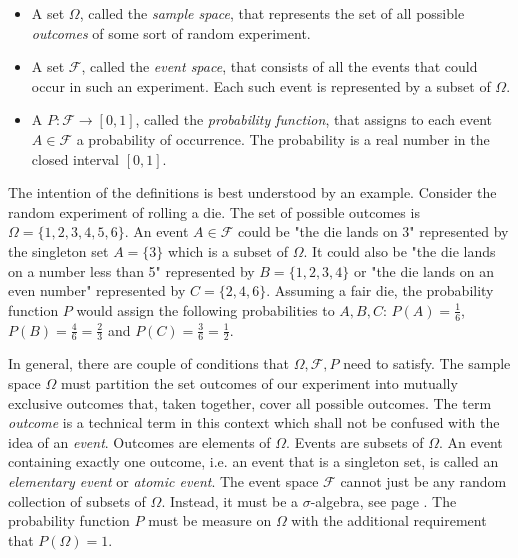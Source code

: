 \begin{itemize}

\item 
A set $\Omega$, called the \emph{sample space}, that represents the set of all possible \emph{outcomes} of some sort of random experiment.

\item
A set $\mathcal{F}$, called the \emph{event space}, that consists of all the events that could occur in such an experiment. Each such event is represented by a subset of $\Omega$.

\item 
A  $P: \mathcal{F} \rightarrow [0,1]$, called the \emph{probability function}, that assigns to each event $A \in \mathcal{F}$ a probability of occurrence. The probability is a real number in the closed interval $[0,1]$.

\end{itemize}

The intention of the definitions is best understood by an example. Consider the random experiment of rolling a die. The set of possible outcomes is $\Omega = \{1,2,3,4,5,6\}$. An event $A \in \mathcal{F}$ could be "the die lands on 3" represented by the singleton set $A = \{3\}$ which is a subset of $\Omega$. It could also be "the die lands on a number less than 5" represented by $B = \{1,2,3,4\}$ or "the die lands on an even number" represented by $C = \{2,4,6\}$. Assuming a fair die, the probability function $P$ would assign the following probabilities to $A,B,C$: $P(A) = \frac{1}{6}$, $P(B) = \frac{4}{6} = \frac{2}{3}$ and  $P(C) = \frac{3}{6} = \frac{1}{2}$.

\medskip
In general, there are couple of conditions that $\Omega, \mathcal{F}, P$ need to satisfy. The sample space  $\Omega$ must partition the set outcomes of our experiment into mutually exclusive outcomes that, taken together, cover all possible outcomes. The term \emph{outcome} is a technical term in this context which shall not be confused with the idea of an \emph{event}. Outcomes are elements of $\Omega$. Events are subsets of $\Omega$. An event containing exactly one outcome, i.e. an event that is a singleton set, is called an \emph{elementary event} or \emph{atomic event}. The event space $\mathcal{F}$ cannot just be any random collection of subsets of $\Omega$. Instead, it must be a $\sigma$-algebra, see page \pageref{Def:SigmaAlgebra}. The probability function $P$ must be measure on $\Omega$ with the additional requirement that $P(\Omega) = 1$. 

